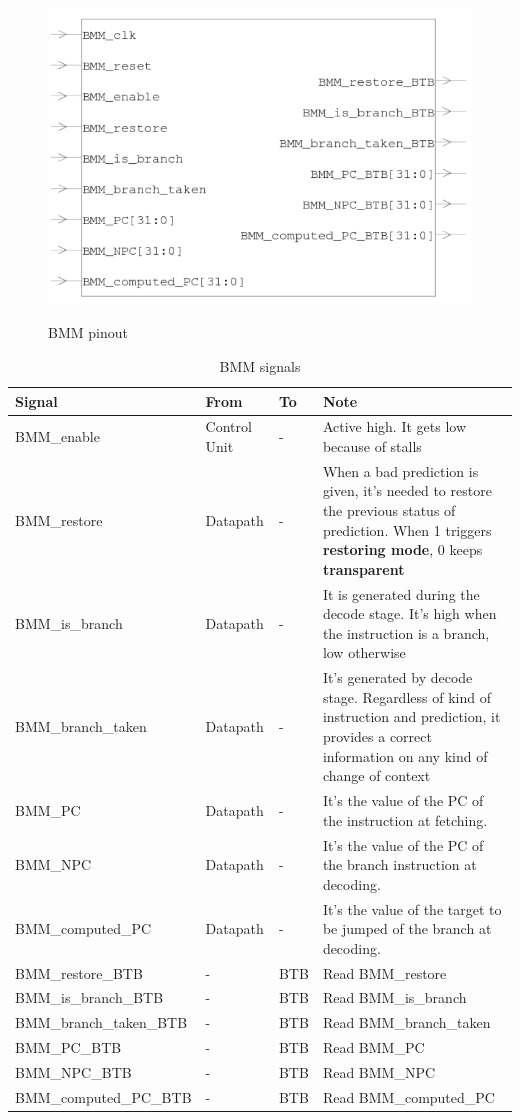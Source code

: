 \begin{figure}[H]
\centering
\includegraphics[scale=.7]{Immagini/18}
\label{18}
\caption{BMM pinout}
\end{figure}
\begin{table}[H]
\centering
\begin{tabular}{|p{}|p{}|p{}|p{}|}
\hline
\textbf{Signal}&\textbf{From}&\textbf{To}&\textbf{Note}\\ \hline
BMM\_enable & Control Unit & - & Active high. It gets low because of stalls \\ \hline
BMM\_restore &  Datapath & - & When a bad prediction is given, it's needed to restore the previous status of prediction. When 1 triggers \textbf{restoring mode}, 0 keeps \textbf{transparent}\\ \hline
BMM\_is\_branch & Datapath & - & It is generated during the decode stage. It's high when the instruction is a branch, low otherwise\\ \hline
BMM\_branch\_taken & Datapath & - & It's generated by decode stage. Regardless of kind of instruction and prediction, it provides a correct information on any kind of change of context\\ \hline
BMM\_PC & Datapath & - & It's the value of the PC of the instruction at fetching. \\ \hline
BMM\_NPC & Datapath & - & It's the value of the PC of the branch instruction at decoding.\\ \hline
BMM\_computed\_PC & Datapath & - & It's the value of the target to be jumped of the branch at decoding. \\ \hline
BMM\_restore\_BTB & - & BTB & Read BMM\_restore\\ \hline
BMM\_is\_branch\_BTB & - & BTB & Read BMM\_is\_branch  \\ \hline
BMM\_branch\_taken\_BTB & - & BTB & Read BMM\_branch\_taken \\ \hline
BMM\_PC\_BTB & - & BTB & Read BMM\_PC\\ \hline
BMM\_NPC\_BTB & - & BTB & Read BMM\_NPC\\ \hline
BMM\_computed\_PC\_BTB & - & BTB & Read  BMM\_computed\_PC \\ \hline
\end{tabular}
\caption{BMM signals}
\end{table}
